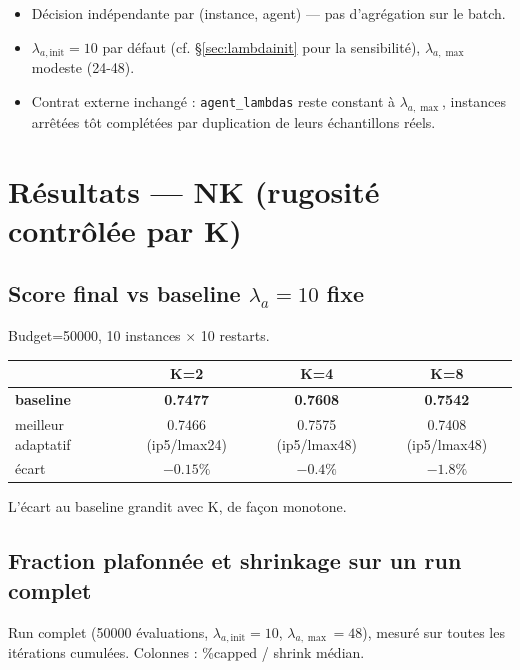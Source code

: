 \documentclass{article}
\begin{document}
\begin{itemize}
  \item Décision indépendante par (instance, agent) — pas d'agrégation sur le batch.
  \item $\lambda_{a,\mathrm{init}}=10$ par défaut (cf. §\ref{sec:lambdainit} pour la
    sensibilité), $\lambda_{a,\max}$ modeste (24-48).
  \item Contrat externe inchangé : \texttt{agent\_lambdas} reste constant à $\lambda_{a,\max}$,
    instances arrêtées tôt complétées par duplication de leurs échantillons réels.
\end{itemize}

\section{Résultats — NK (rugosité contrôlée par K)}

\subsection{Score final vs baseline $\lambda_a=10$ fixe}

Budget=50000, 10 instances $\times$ 10 restarts.

\begin{center}
\begin{tabular}{@{}lccc@{}}
\toprule
 & K=2 & K=4 & K=8 \\
\midrule
\textbf{baseline} & \textbf{0.7477} & \textbf{0.7608} & \textbf{0.7542} \\
meilleur adaptatif & 0.7466 (ip5/lmax24) & 0.7575 (ip5/lmax48) & 0.7408 (ip5/lmax48) \\
écart & $-0.15\%$ & $-0.4\%$ & $\mathbf{-1.8\%}$ \\
\bottomrule
\end{tabular}
\end{center}

L'écart au baseline grandit avec K, de façon monotone.

\subsection{Fraction plafonnée et shrinkage sur un run complet}

Run complet (50000 évaluations, $\lambda_{a,\mathrm{init}}=10$, $\lambda_{a,\max}=48$), mesuré
sur toutes les itérations cumulées. Colonnes : \%capped / shrink médian.
\end{document}
